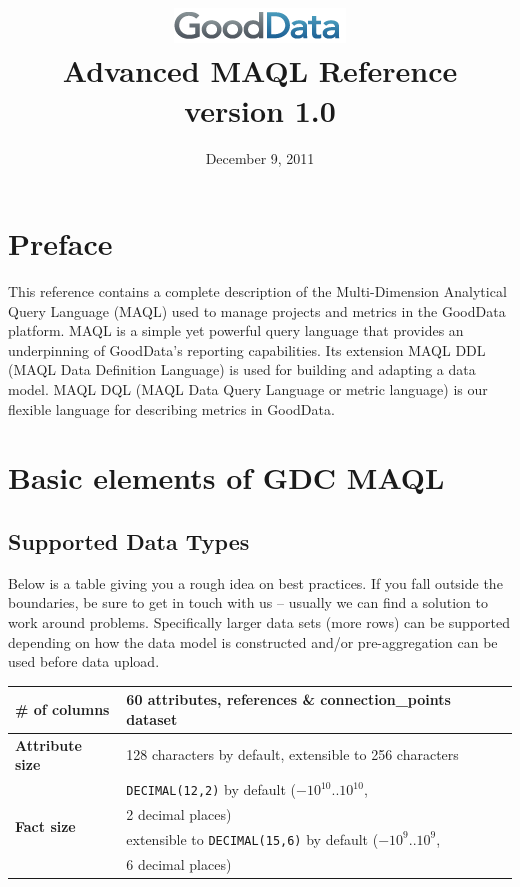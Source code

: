 \documentclass[a4paper, 12pt, titlepage, fleqn]{article}
\begin{document}
\title{\includegraphics[scale=0.8]{images/logo.png} \vspace{5mm} \\ Advanced MAQL Reference\\version 1.0}
\author{}
\date{December 9, 2011}
\maketitle

\tableofcontents
\clearpage

\section*{Preface}
This reference contains a complete description of the Multi-Dimension Analytical Query Language (MAQL) used to manage projects and metrics in the GoodData platform. MAQL is a simple yet powerful query language that provides an underpinning of GoodData’s reporting capabilities. Its extension MAQL DDL (MAQL Data Definition Language) is used for building and adapting a data model. MAQL DQL (MAQL Data Query Language or metric language) is our flexible language for describing metrics in GoodData.

\section{Basic elements of GDC MAQL}

\subsection{Supported Data Types}
Below is a table giving you a rough idea on best practices. If you fall outside the boundaries, be sure to get in touch with us -- usually we can find a solution to work around problems. Specifically larger data sets (more rows) can be supported depending on how the data model is constructed and/or pre-aggregation can be used before data upload.\\

\begin{center}
\begin{tabular}{|l|l|} 
\hline
\textbf{\# of columns} & 60 attributes, references \& connection\_points \/ dataset \\ \hline
\textbf{Attribute size} & 128 characters by default, extensible to 256 characters\\ \hline
\multirow{4}{*}{\textbf{Fact size}} & \verb=DECIMAL(12,2)= by default ($-10^{10}..10^{10}$, \\ 
& 2 decimal places) \\ 
& extensible to \verb=DECIMAL(15,6)= by default ($-10^{9}..10^{9}$,\\ 
& 6 decimal places) \\ \hline
\end{tabular}\\
\end{center}
\end{document}
